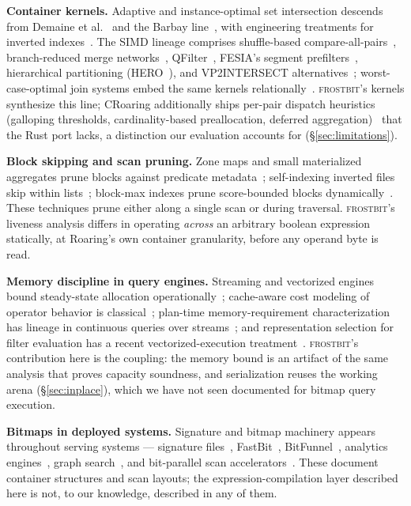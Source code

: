 \documentclass[sigconf,nonacm]{acmart}
\newcommand{\fb}{\textsc{frostbit}}
\begin{document}
\textbf{Container kernels.} Adaptive and instance-optimal set
intersection descends from Demaine et al.~\cite{demaine2000} and the
Barbay line~\cite{barbay2006,barbay2010}, with engineering treatments
for inverted indexes~\cite{culpepper2010,ding2011konig}. The SIMD
lineage comprises shuffle-based
compare-all-pairs~\cite{schlegel2011,lemire2016simd}, branch-reduced
merge networks~\cite{inoue2014}, QFilter~\cite{han2018}, FESIA's
segment prefilters~\cite{fesia2020}, hierarchical partitioning
(HERO~\cite{hero2024}), and VP2INTERSECT
alternatives~\cite{diez2021}; worst-case-optimal join systems embed the
same kernels relationally~\cite{veldhuizen2014,aberger2016}. \fb's
kernels synthesize this line; CRoaring additionally ships per-pair
dispatch heuristics (galloping thresholds, cardinality-based
preallocation, deferred aggregation)~\cite{chambi2016,lemire2018} that
the Rust port lacks, a distinction our evaluation accounts for
(\S\ref{sec:limitations}).

\textbf{Block skipping and scan pruning.} Zone maps and small
materialized aggregates prune blocks against predicate
metadata~\cite{moerkotte1998,snowflake2016}; self-indexing inverted
files skip within lists~\cite{moffat1996}; block-max indexes prune
score-bounded blocks dynamically~\cite{ding2011}. These techniques
prune either along a single scan or during traversal. \fb's liveness
analysis differs in operating \emph{across} an arbitrary boolean
expression statically, at Roaring's own container granularity, before
any operand byte is read.

\textbf{Memory discipline in query engines.} Streaming and vectorized
engines bound steady-state allocation
operationally~\cite{trill2015,photon2022,boncz2005}; cache-aware
cost modeling of operator behavior is
classical~\cite{wolf1991,manegold2002}; plan-time memory-requirement
characterization has lineage in continuous queries over
streams~\cite{arasu2002}; and representation selection for filter
evaluation has a recent vectorized-execution
treatment~\cite{ngom2021}. \fb's contribution here is the
coupling: the memory bound is an artifact of the same analysis that
proves capacity soundness, and serialization reuses the working arena
(\S\ref{sec:inplace}), which we have not seen documented for bitmap
query execution.

\textbf{Bitmaps in deployed systems.} Signature and bitmap machinery
appears throughout serving systems --- signature
files~\cite{faloutsos1984,zobel1998}, FastBit~\cite{wu2009},
BitFunnel~\cite{bitfunnel2017}, analytics engines~\cite{druid2014,
druidroaring2016,pinot2018,procella2019,clickhouse2024,dremel2010},
graph search~\cite{unicorn2013}, and bit-parallel scan
accelerators~\cite{bitweaving2013,byteslice2015,imprints2013,
sketches2018,datablocks2016}. These document container structures and
scan layouts; the expression-compilation layer described here is not, to
our knowledge, described in any of them.
\end{document}
